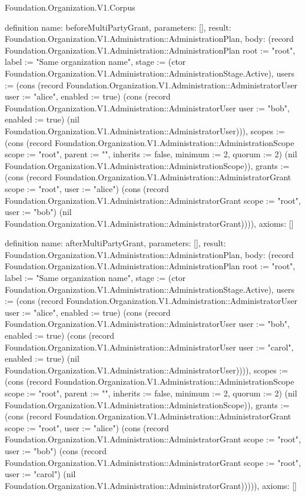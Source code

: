 \begin{lexlean}{Foundation.Organization.V1.Corpus}
\begin{semanticmodule}
definition{
  name: beforeMultiPartyGrant,
  parameters: [],
  result: Foundation.Organization.V1.Administration::AdministrationPlan,
  body: (record Foundation.Organization.V1.Administration::AdministrationPlan {root := "root", label := "Same organization name", stage := (ctor Foundation.Organization.V1.Administration::AdministrationStage.Active), users := (cons (record Foundation.Organization.V1.Administration::AdministratorUser {user := "alice", enabled := true}) (cons (record Foundation.Organization.V1.Administration::AdministratorUser {user := "bob", enabled := true}) (nil Foundation.Organization.V1.Administration::AdministratorUser))), scopes := (cons (record Foundation.Organization.V1.Administration::AdministrationScope {scope := "root", parent := "", inherits := false, minimum := 2, quorum := 2}) (nil Foundation.Organization.V1.Administration::AdministrationScope)), grants := (cons (record Foundation.Organization.V1.Administration::AdministratorGrant {scope := "root", user := "alice"}) (cons (record Foundation.Organization.V1.Administration::AdministratorGrant {scope := "root", user := "bob"}) (nil Foundation.Organization.V1.Administration::AdministratorGrant)))}),
  axioms: []
}

definition{
  name: afterMultiPartyGrant,
  parameters: [],
  result: Foundation.Organization.V1.Administration::AdministrationPlan,
  body: (record Foundation.Organization.V1.Administration::AdministrationPlan {root := "root", label := "Same organization name", stage := (ctor Foundation.Organization.V1.Administration::AdministrationStage.Active), users := (cons (record Foundation.Organization.V1.Administration::AdministratorUser {user := "alice", enabled := true}) (cons (record Foundation.Organization.V1.Administration::AdministratorUser {user := "bob", enabled := true}) (cons (record Foundation.Organization.V1.Administration::AdministratorUser {user := "carol", enabled := true}) (nil Foundation.Organization.V1.Administration::AdministratorUser)))), scopes := (cons (record Foundation.Organization.V1.Administration::AdministrationScope {scope := "root", parent := "", inherits := false, minimum := 2, quorum := 2}) (nil Foundation.Organization.V1.Administration::AdministrationScope)), grants := (cons (record Foundation.Organization.V1.Administration::AdministratorGrant {scope := "root", user := "alice"}) (cons (record Foundation.Organization.V1.Administration::AdministratorGrant {scope := "root", user := "bob"}) (cons (record Foundation.Organization.V1.Administration::AdministratorGrant {scope := "root", user := "carol"}) (nil Foundation.Organization.V1.Administration::AdministratorGrant))))}),
  axioms: []
}


\end{semanticmodule}
\end{lexlean}
